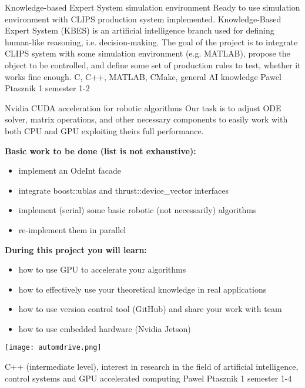 \begin{project}
{Knowledge-based Expert System simulation environment}
{Ready to use simulation environment with CLIPS production system implemented.}
{
Knowledge-Based Expert System (KBES) is an artificial intelligence branch used for defining human-like reasoning, i.e. decision-making. The goal of the project is to integrate CLIPS system with some simulation environment (e.g. MATLAB), propose the object to be controlled, and define some set of production rules to test, whether it works fine enough. }
{C, C++, MATLAB, CMake, general AI knowledge}
{Pawel Ptasznik}
{1 semester}
{1-2}
\end{project}
\begin{project}
{Nvidia CUDA acceleration for robotic algorithms}
{Our task is to adjust ODE solver, matrix operations, and other necessary components to easily work with both CPU and GPU exploiting theirs full performance.}
{
\textbf{Basic work to be done (list is not exhaustive):}
\begin{itemize}
	\item implement an OdeInt facade
	\item integrate boost::ublas and thrust::device\_vector interfaces
	\item implement (serial) some basic robotic (not necessarily) algorithms
	\item re-implement them in parallel
\end{itemize}
\textbf{During this project you will learn:}
\begin{itemize}
	\item how to use GPU to accelerate your algorithms
	\item how to effectively use your theoretical knowledge in real applications
	\item how to use version control tool (GitHub) and share your work with team
	\item how to use embedded hardware (Nvidia Jetson)
\end{itemize}
\begin{center}\texttt{[image: automdrive.png]}\end{center}
}
{C++ (intermediate level), interest in research in the field of artificial intelligence, control systems and GPU accelerated computing}
{Pawel Ptasznik}
{1 semester}
{1-4}
\end{project}
